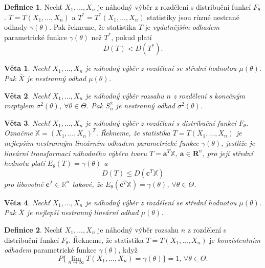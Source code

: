 \documentclass[a4]{report}
\newtheorem{theorem}{Věta}
\theoremstyle{definition}
\newtheorem{definition}{Definice}[section]
\begin{document}
{\begin{definition}
Nechť $X_1,\ldots,X_n$ je náhodný výběr z rozdělení s distribuční funkcí $F_{\theta}$. $T=T \left(X_1,\ldots,X_n \right)$ a $T^{*}=T^{*} \left(X_1,\ldots,X_n \right)$ statistiky jsou různé nestrané odhady $\gamma \left(\theta \right)$. Pak řekneme, že statistika $T$ je \textit{vydatnějším odhadem} parametrické funkce $\gamma \left(\theta \right)$ než $T^{*}$, pokud platí $$D \left( T \right) < D \left( T^{*} \right).$$
\end{definition}

\begin{theorem}
Nechť $X_1,\ldots,X_n$ je náhodný výběr z rozdělení se střední hodnotou $\mu \left(\theta \right)$. Pak $\bar{X}$ je nestranný odhad $\mu \left(\theta \right)$.
\end{theorem}

\begin{theorem}
Nechť $X_1,\ldots,X_n$ je náhodný výběr rozsahu $n$ z rozdělení s konečným rozptylem $\sigma^2 \left(\theta \right)$, $\forall \theta \in \Theta $. Pak $S_{n}^{2}$ je nestranný odhad $\sigma^2 \left(\theta \right)$. 
\end{theorem}

\begin{theorem}
Nechť $X_1,\ldots,X_n$ je náhodný výběr z rozdělení s distribuční funkcí $F_{\theta}$. Označme $\mathbb{X} = \left(X_1,\ldots,X_n \right)^T$. Řekneme, že statistika $T=T \left(X_1,\ldots,X_n \right)$ je \textit{nejlepším nestranným lineárním odhadem} parametrické funkce $\gamma \left(\theta \right)$, jestliže je lineární transformací náhodného výběru tvaru $T = \mathbf{a}^T\mathbb{X}$, $\mathbf{a} \in \mathbf{R}^n$, pro její střední hodnotu platí $E_{\theta} \left(T \right) = \gamma \left(\theta \right)$ a 
$$D \left(T\right) \leq D\left(\mathbf{c}^T \mathbb{X} \right)$$ 
pro libovolné $\mathbf{c}^T \in  \mathbb{R}^n$ takové, že $E_{\theta} \left(\mathbf{c}^T \mathbb{X} \right) = \gamma \left(\theta \right)$, $\forall \theta \in \Theta$. 
\end{theorem}

\begin{theorem}
Nechť $X_1,\ldots,X_n$ je náhodný výběr z rozdělení se střední hodnotou $\mu \left(\theta \right)$. Pak $\bar{X}$ je nejlepší nestranný lineární odhad $\mu \left(\theta \right)$.
\end{theorem}

\begin{definition}
Nechť $X_1,\ldots,X_n$ je náhodný výběr rozsahu $n$ z rozdělení s distribuční funkcí $F_{\theta}$. Řekneme, že statistika $T=T \left(X_1,\ldots,X_n \right)$ je \textit{konzistentním odhadem} parametrické funkce $\gamma \left(\theta \right)$, když $$P\{ \lim_{n \to \infty} T \left(X_1,\ldots,X_n \right) = \gamma \left(\theta \right) \}=1, \, \forall \theta \in \Theta.$$
\end{definition}

}
\end{document}
